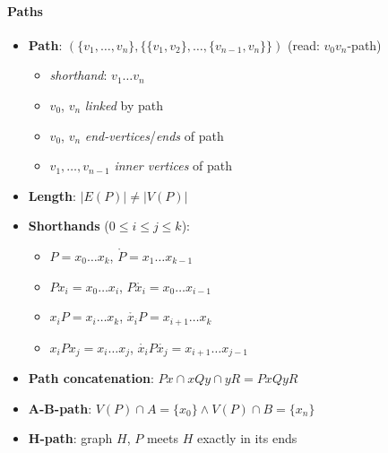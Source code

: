 \paragraph{Paths}
\begin{itemize}
  \item \textbf{Path}: $ (\{ v_1, \dots, v_n \}, \{ \{ v_1, v_2 \}, \dots, \{ v_{n-1},v_n \} \}) $ (read: $ v_0v_n $-path)
  \begin{itemize}
    \item \emph{shorthand}: $ v_1\dots v_n $
    \item $ v_0 $, $ v_n $ \emph{linked} by path 
    \item $ v_0 $, $ v_n $ \emph{end-vertices}/\emph{ends} of path
    \item $ v_1, \dots, v_{n-1} $ \emph{inner vertices} of path
  \end{itemize}
  \item \textbf{Length}: $ \vert E(P) \vert \neq \vert V(P) \vert $
  \item \textbf{Shorthands} ($ 0 \leq i \leq j \leq k $):
  \begin{itemize}
    \item $ P = x_0\dots x_k $, $ \mathring{P} = x_1\dots x_{k-1} $
    \item $ Px_i = x_0\dots x_i $, $ P\mathring{x_i} = x_0\dots x_{i-1} $
    \item $ x_iP = x_i\dots x_k $, $ \mathring{x_i}P = x_{i+1}\dots x_k $
    \item $ x_iPx_j = x_i\dots x_j $, $ \mathring{x_i}P\mathring{x_j} = x_{i+1}\dots x_{j-1} $
  \end{itemize}
  \item \textbf{Path concatenation}: $ Px \cap xQy \cap yR = PxQyR $
  \item \textbf{A-B-path}: $ V(P) \cap A = \{ x_0 \} \wedge V(P) \cap B = \{ x_n \} $
  \item \textbf{H-path}: graph $ H $, $ P $ meets $ H $ exactly in its ends


\end{itemize}
